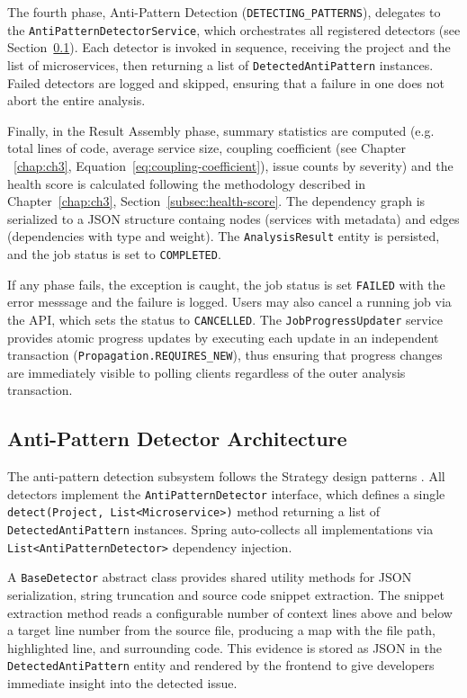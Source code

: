 The fourth phase, Anti-Pattern Detection (\texttt{DETECTING\_PATTERNS}), delegates to the \texttt{AntiPatternDetectorService}, which orchestrates all registered detectors (see Section~\ref{subsec:detector-architecture}). Each detector is invoked in sequence, receiving the project and the list of microservices, then returning a list of \texttt{DetectedAntiPattern} instances. Failed detectors are logged and skipped, ensuring that a failure in one does not abort the entire analysis.

Finally, in the Result Assembly phase, summary statistics are computed (e.g. total lines of code, average service size, coupling coefficient (see Chapter ~\ref{chap:ch3}, Equation~\ref{eq:coupling-coefficient}), issue counts by severity) and the health score is calculated following the methodology described in Chapter~\ref{chap:ch3}, Section~\ref{subsec:health-score}. The dependency graph is serialized to a JSON structure containg nodes (services with metadata) and edges (dependencies with type and weight). The \texttt{AnalysisResult} entity is persisted, and the job status is set to \texttt{COMPLETED}.

If any phase fails, the exception is caught, the job status is set \texttt{FAILED} with the error messsage and the failure is logged. Users may also cancel a running job via the API, which sets the status to \texttt{CANCELLED}. The \texttt{JobProgressUpdater} service provides atomic progress updates by executing each update in an independent transaction (\texttt{Propagation.REQUIRES\_NEW}), thus ensuring that progress changes are immediately visible to polling clients regardless of the outer analysis transaction.

\subsection{Anti-Pattern Detector Architecture}
\label{subsec:detector-architecture}

 \par The anti-pattern detection subsystem follows the Strategy design patterns \cite{Gamma1994}. All detectors implement the \texttt{AntiPatternDetector} interface, which defines a single \texttt{detect(Project, List<Microservice>)} method returning a list of \texttt{DetectedAntiPattern} instances. Spring auto-collects all implementations via \texttt{List<AntiPatternDetector>} dependency injection.

A \texttt{BaseDetector} abstract class provides shared utility methods for JSON serialization, string truncation and source code snippet extraction. The snippet extraction method reads a configurable number of context lines above and below a target line number from the source file, producing a map with the file path, highlighted line, and surrounding code. This evidence is stored as JSON in the \texttt{De\-tec\-tedAn\-tiPa\-ttern} entity and rendered by the frontend to give developers immediate insight into the detected issue.

